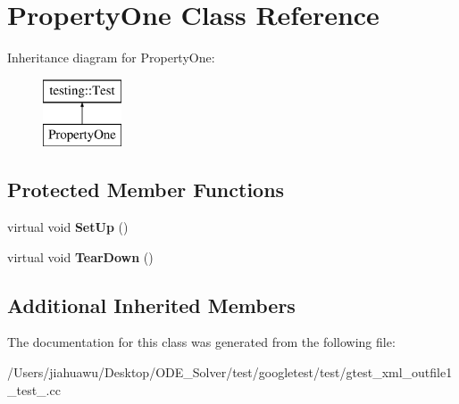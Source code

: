 \hypertarget{class_property_one}{}\section{Property\+One Class Reference}
\label{class_property_one}
Inheritance diagram for Property\+One\+:\begin{figure}[H]
\begin{center}
\leavevmode
\includegraphics[height=2.000000cm]{class_property_one}
\end{center}
\end{figure}
\subsection*{Protected Member Functions}
\begin{DoxyCompactItemize}
\item 
\mbox{\label{class_property_one_a9cb7d7cb508d5f1a6fc7cfead81ebc2b}} 
virtual void {\bfseries Set\+Up} ()
\item 
\mbox{\label{class_property_one_a3ed895113848403d5ea27f52a1bb0545}} 
virtual void {\bfseries Tear\+Down} ()
\end{DoxyCompactItemize}
\subsection*{Additional Inherited Members}


The documentation for this class was generated from the following file\+:\begin{DoxyCompactItemize}
\item 
/\+Users/jiahuawu/\+Desktop/\+O\+D\+E\+\_\+\+Solver/test/googletest/test/gtest\+\_\+xml\+\_\+outfile1\+\_\+test\+\_\+.\+cc\end{DoxyCompactItemize}
